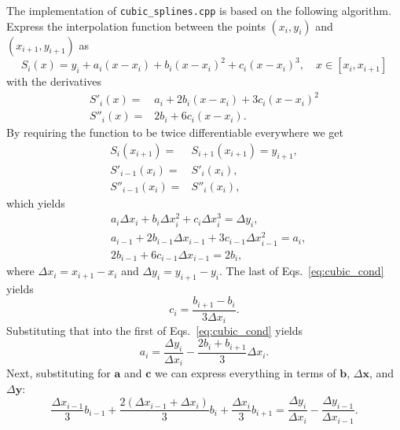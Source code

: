 \documentclass{article}
\begin{document}
The implementation of \verb+cubic_splines.cpp+ is based on the following algorithm. Express the interpolation function between the points $(x_i,y_i)$ and $(x_{i+1},y_{i+1})$ as
\begin{equation}
  S_i(x) = y_i + a_i(x-x_i) + b_i(x-x_i)^2 + c_i(x-x_i)^3, \quad x \in [x_i, x_{i+1}]
\end{equation}
with the derivatives
\begin{equation}
  \begin{split}
    S'_i(x) =& a_i + 2b_i(x-x_i) + 3c_i(x-x_i)^2 \\
    S''_i(x) =& 2b_i + 6c_i(x-x_i).
  \end{split}
\end{equation}
By requiring the function to be twice differentiable everywhere we get
\begin{equation}
  \begin{split}
    S_i(x_{i+1}) =& S_{i+1}(x_{i+1}) = y_{i+1}, \\
    S'_{i-1}(x_i) =& S'_i(x_i), \\
    S''_{i-1}(x_i) =& S''_i(x_i),
  \end{split}
\end{equation}
which yields
\begin{equation}
  \begin{split}
    \label{eq:cubic_cond}
    & a_i\Delta x_i + b_i\Delta x_i^2 + c_i\Delta x_i^3 = \Delta y_i, \\
    & a_{i-1} + 2b_{i-1}\Delta x_{i-1} + 3c_{i-1}\Delta x_{i-1}^2 = a_i, \\
    & 2b_{i-1} + 6c_{i-1}\Delta x_{i-1} = 2b_i,
  \end{split}
\end{equation}
where $\Delta x_i = x_{i+1} - x_i$ and $\Delta y_i = y_{i+1} - y_i$. The last of Eqs.~\eqref{eq:cubic_cond} yields
\begin{equation}
  c_i = \frac{b_{i+1} - b_i}{3\Delta x_i}.
\end{equation}
Substituting that into the first of Eqs.~\eqref{eq:cubic_cond} yields
\begin{equation}
  a_i = \frac{\Delta y_i}{\Delta x_i} - \frac{2b_i + b_{i+1}}{3}\Delta x_i.
\end{equation}
Next, substituting for $\bm a$ and $\bm c$ we can express everything in terms of $\bm b$, $\Delta \bm x$, and $\Delta \bm y$:
\begin{equation}
  \frac{\Delta x_{i-1}}{3}b_{i-1} + \frac{2(\Delta x_{i-1} + \Delta x_i)}{3}b_i + \frac{\Delta x_i}{3}b_{i+1} = \frac{\Delta y_i}{\Delta x_i} - \frac{\Delta y_{i-1}}{\Delta x_{i-1}}.
\end{equation}
\end{document}
